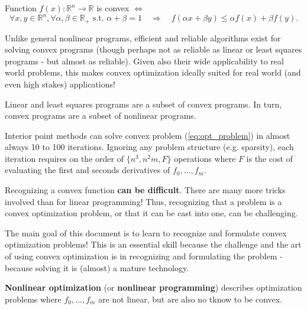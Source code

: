 \begin{Definition}
  Function $f(x):\mathbb R^n\to\mathbb R$ is convex $\Leftrightarrow$
  \begin{equation*}
    \forall x,y\in\mathbb R^n, \forall \alpha,\beta\in\mathbb R_+\text{ s.t. }\alpha+\beta=1\quad\Rightarrow\quad f(\alpha x+\beta y)\le \alpha f(x)+\beta f(y).
  \end{equation*}
\end{Definition}

Unlike general nonlinear programs, efficient and reliable algorithms exist for solving convex programs (though perhaps not as reliable as linear or least squares programs - but almost as reliable). Given also their wide applicability to real world problems, this makes convex optimization ideally suited for real world (and even high stakes) applications!

\begin{Fact}
  Linear and least squares programs are a subset of convex programs. In turn, convex programs are a subset of nonlinear programs.
\end{Fact}

\begin{Fact}
  Interior point methods can solve convex problem (\ref{eq:opt_problem}) in almost always 10 to 100 iterations. Ignoring any problem structure (e.g. sparsity), each iteration requires on the order of $\{n^3, n^2m, F\}$ operations where $F$ is the cost of evaluating the first and seconds derivatives of $f_0,...,f_m$.
\end{Fact}

Recognizing a convex function \textbf{can be difficult}. There are many more tricks involved than for linear programming! Thus, recognizing that a problem is a convex optimization problem, or that it can be cast into one, can be challenging.

\begin{Fact}
  The main goal of this document is to learn to recognize and formulate convex optimization problems! This is an essential skill because the challenge and the art of using convex optimization is in recognizing and formulating the problem - because solving it is (almost) a mature technology.
\end{Fact}


\begin{Definition}
  \textbf{Nonlinear optimization} (or \textbf{nonlinear programming}) describes optimization problems where $f_0,...,f_m$ are not linear, but are also no tknow to be convex.
\end{Definition}

